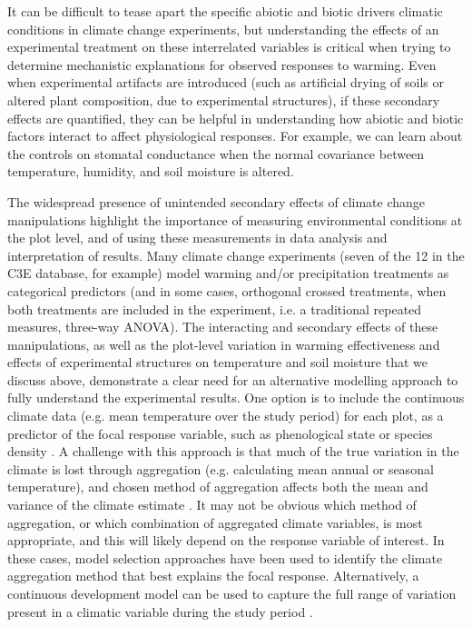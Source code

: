 \documentclass{article}
\begin{document}
\par It can be difficult to tease apart the specific abiotic and biotic drivers climatic conditions in climate change experiments, but understanding the effects of an experimental treatment on these interrelated variables is critical when trying to determine mechanistic explanations for observed responses to warming. Even when experimental artifacts are introduced (such as artificial drying of soils or altered plant composition, due to experimental structures), if these secondary effects are quantified, they can be helpful in understanding how abiotic and biotic factors interact to affect physiological responses. For example, we can learn about the controls on stomatal conductance when the normal covariance between temperature, humidity, and soil moisture is altered. 
\par The widespread presence of unintended secondary effects of climate change manipulations highlight the importance of measuring environmental conditions at the plot level, and of using these measurements in data analysis and interpretation of results. Many climate change experiments (seven of the 12 in the C3E database, for example) model warming and/or precipitation treatments as categorical predictors (and in some cases, orthogonal crossed treatments, when both treatments are included in the experiment, i.e. a traditional repeated measures, three-way ANOVA). The interacting and secondary effects of these manipulations, as well as the plot-level variation in warming effectiveness and effects of experimental structures on temperature and soil moisture that we discuss above, demonstrate a clear need for an alternative modelling approach to fully understand the experimental results. One option is to include the continuous climate data (e.g. mean temperature over the study period) for each plot, as a predictor of the focal response variable, such as phenological state or species density \citep [e.g.][]{marchin2015, pelini2014}. A challenge with this approach is that much of the true variation in the climate is lost through aggregation (e.g. calculating mean annual or seasonal temperature), and chosen method of aggregation affects both the mean and variance of the climate estimate \citep [e.g.][]{clark2014b}. It may not be obvious which method of aggregation, or which combination of aggregated climate variables, is most appropriate, and this will likely depend on the response variable of interest. In these cases, model selection approaches have been used to identify the climate aggregation method that best explains the focal response\citep [e.g.][]{morin2010}. Alternatively, a continuous development model can be used to capture the full range of variation present in a climatic variable during the study period \citep [e.g.][]{clark2014b}.
\end{document}
